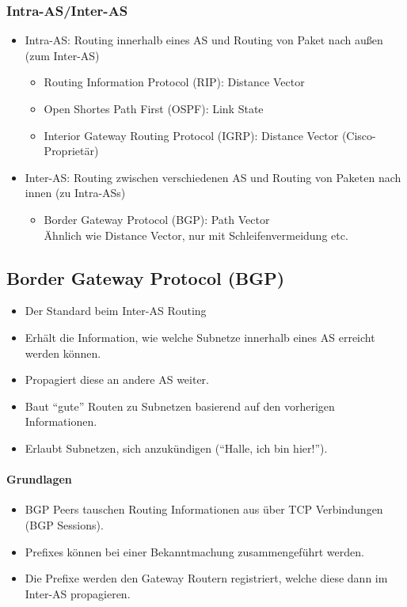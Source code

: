 			\subsubsection{Intra-AS/Inter-AS}
				\begin{itemize}
					\item Intra-AS: Routing innerhalb eines AS und Routing von Paket nach außen (zum Inter-AS)
						\begin{itemize}
							\item Routing Information Protocol (RIP): Distance Vector
							\item Open Shortes Path First (OSPF): Link State
							\item Interior Gateway Routing Protocol (IGRP): Distance Vector (Cisco-Proprietär)
						\end{itemize}
					\item Inter-AS: Routing zwischen verschiedenen AS und Routing von Paketen nach innen (zu Intra-ASs)
						\begin{itemize}
							\item Border Gateway Protocol (BGP): Path Vector \\ Ähnlich wie Distance Vector, nur mit Schleifenvermeidung etc.
						\end{itemize}
				\end{itemize}

		\subsection{Border Gateway Protocol (BGP)}
			\begin{itemize}
				\item Der Standard beim Inter-AS Routing
				\item Erhält die Information, wie welche Subnetze innerhalb eines AS erreicht werden können.
				\item Propagiert diese an andere AS weiter.
				\item Baut \enquote{gute} Routen zu Subnetzen basierend auf den vorherigen Informationen.
				\item Erlaubt Subnetzen, sich anzukündigen (\enquote{Halle, ich bin hier!}).
			\end{itemize}

			\paragraph{Grundlagen}
				\begin{itemize}
					\item BGP Peers tauschen Routing Informationen aus über TCP Verbindungen (BGP Sessions).
					\item Prefixes können bei einer Bekanntmachung zusammengeführt werden.
					\item Die Prefixe werden den Gateway Routern registriert, welche diese dann im Inter-AS propagieren.
				\end{itemize}

